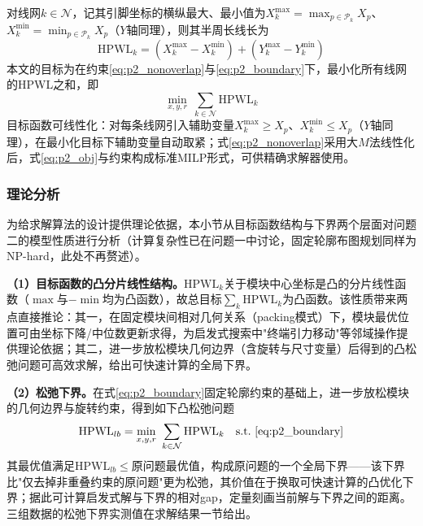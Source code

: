\documentclass{JXUSTmodeling}
\begin{document}
对线网$k\in\mathcal{N}$，记其引脚坐标的横纵最大、最小值为$X_k^{\max}=\max_{p\in\mathcal{P}_k}X_p$、$X_k^{\min}=\min_{p\in\mathcal{P}_k}X_p$（$Y$轴同理），则其半周长线长为
\begin{equation}
\mathrm{HPWL}_k=(X_k^{\max}-X_k^{\min})+(Y_k^{\max}-Y_k^{\min})
\label{eq:p2_hpwl}
\end{equation}
本文的目标为在约束\eqref{eq:p2_nonoverlap}与\eqref{eq:p2_boundary}下，最小化所有线网的HPWL之和，即
\begin{equation}
\min_{x,y,r}\ \sum_{k\in\mathcal{N}}\mathrm{HPWL}_k
\label{eq:p2_obj}
\end{equation}
目标函数可线性化：对每条线网引入辅助变量$X_k^{\max}\ge X_p$、$X_k^{\min}\le X_p$（$Y$轴同理），在最小化目标下辅助变量自动取紧；式\eqref{eq:p2_nonoverlap}采用大$M$法线性化后，式\eqref{eq:p2_obj}与约束构成标准MILP形式，可供精确求解器使用。

\subsubsection{理论分析}
为给求解算法的设计提供理论依据，本小节从目标函数结构与下界两个层面对问题二的模型性质进行分析（计算复杂性已在问题一中讨论，固定轮廓布图规划同样为NP-hard，此处不再赘述）。

\textbf{（1）目标函数的凸分片线性结构。}$\mathrm{HPWL}_k$关于模块中心坐标是凸的分片线性函数（$\max$与$-\min$均为凸函数），故总目标$\sum_{k}\mathrm{HPWL}_k$为凸函数。该性质带来两点直接推论：其一，在固定模块间相对几何关系（packing模式）下，模块最优位置可由坐标下降/中位数更新求得，为启发式搜索中"终端引力移动"等邻域操作提供理论依据；其二，进一步放松模块几何边界（含旋转与尺寸变量）后得到的凸松弛问题可高效求解，给出可快速计算的全局下界。

\textbf{（2）松弛下界。}在式\eqref{eq:p2_boundary}固定轮廓约束的基础上，进一步放松模块的几何边界与旋转约束，得到如下凸松弛问题
\begin{equation}
\mathrm{HPWL}_{lb}=\min_{x,y,r}\ \sum_{k\in\mathcal{N}}\mathrm{HPWL}_k\quad \text{s.t.}\ \eqref{eq:p2_boundary}
\label{eq:p2_lb}
\end{equation}
其最优值满足$\mathrm{HPWL}_{lb}\le$原问题最优值，构成原问题的一个全局下界——该下界比"仅去掉非重叠约束的原问题"更为松弛，其价值在于换取可快速计算的凸优化下界；据此可计算启发式解与下界的相对gap，定量刻画当前解与下界之间的距离。三组数据的松弛下界实测值在求解结果一节给出。
\end{document}
